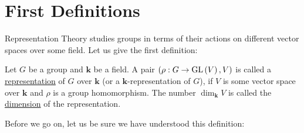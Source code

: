 \chapter{First Definitions}
Representation Theory studies groups in terms of their actions on different vector spaces over some field. Let us give the first definition:

\begin{definition} Let $G$ be a group and $\mathbf{k}$ be a field. A pair $(\rho:G\to\GL{V},V)$ is called a \ul{representation} of $G$ over $\mathbf{k}$ (or a $\mathbf{k}$-representation of $G$), if $V$ is some vector space over $\mathbf{k}$ and $\rho$ is a group homomorphism. The number $\dim_{\mathbf{k}}V$ is called the \ul{dimension} of the representation.
\end{definition}

Before we go on, let us be sure we have understood this definition:

